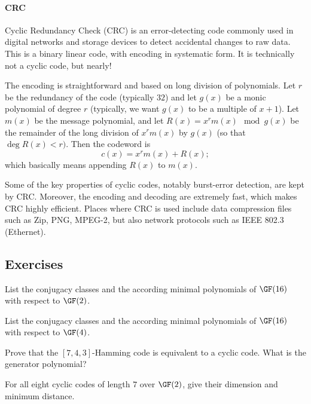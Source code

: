 \documentclass[a4paper, 11pt, openany]{book}
\begin{document}
\paragraph{CRC} Cyclic Redundancy Check (CRC) is an error-detecting code commonly used in digital networks and storage devices to detect accidental changes to raw data. This is a binary linear code, with encoding in systematic form. It is technically not a cyclic code, but nearly!

The encoding is straightforward and based on long division of polynomials. Let $r$ be the redundancy of the code (typically $32$) and let $g(x)$ be a monic polynomial of degree $r$ (typically, we want $g(x)$ to be a multiple of $x + 1$). Let $m(x)$ be the message polynomial, and let $R(x) = x^r m(x) \mod g(x)$ be the remainder of the long division of $x^r m(x)$ by $g(x)$ (so that $\deg R(x) < r)$. Then the codeword is
\[
    c(x) = x^r m(x) + R(x);
\]
which basically means appending $R(x)$ to $m(x)$.

Some of the key properties of cyclic codes, notably burst-error detection, are kept by CRC. Moreover, the encoding and decoding are extremely fast, which makes CRC highly efficient. Places where CRC is used include data compression files such as Zip, PNG, MPEG-2, but also network protocols such as IEEE 802.3 (Ethernet).

\subsection{Exercises}


\begin{exercise}
List the conjugacy classes and the according minimal polynomials of $\GF(16)$ with respect to $\GF(2)$.
\end{exercise}


\begin{exercise}
List the conjugacy classes and the according minimal polynomials of $\GF(16)$ with respect to $\GF(4)$.
\end{exercise}


\begin{exercise}
Prove that the $[7,4,3]$-Hamming code is equivalent to a cyclic code. What is the generator polynomial?
\end{exercise}




\begin{exercise}
For all eight cyclic codes of length $7$ over $\GF(2)$, give their dimension and minimum distance.
\end{exercise}
\end{document}
